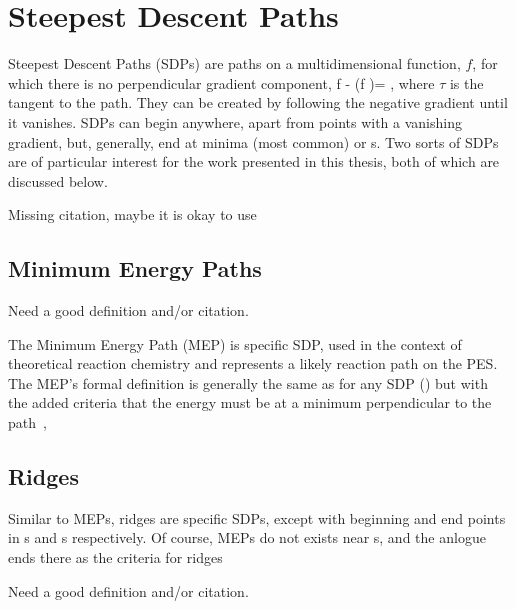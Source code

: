 \section{Steepest Descent Paths}
\label{sec:sdps}


Steepest Descent Paths (SDPs) are paths on a multidimensional function, $f$, for which there is no perpendicular gradient component,
\nabla f - (\nabla f \cdot \tau)\tau = ,
\eeq
where $\tau$ is the tangent to the path.
They can be created by following the negative gradient until it vanishes.
SDPs can begin anywhere, apart from points with a vanishing gradient, but, generally, end at minima (most common) or \sap{}s.
Two sorts of SDPs are of particular interest for the work presented in this thesis, both of which are discussed below.

\bit
\item Missing citation, maybe it is okay to use \cite{gradient-extramals-ruedenberg-1993}
\eit

\subsection{Minimum Energy Paths}
\label{sec:meps}

\bit
\item Need a good definition and/or citation.
\eit

The Minimum Energy Path (MEP) is specific SDP, used in the context of theoretical reaction chemistry and represents a likely reaction path on the PES.
The MEP's formal definition is generally the same as for any SDP () but with the added criteria that the energy must be at a minimum perpendicular to the path~\cite{neb-polemic-henkelman1},
\text{\expand}
\eeq

\subsection{Ridges}
\label{sec:ridges}

Similar to MEPs, ridges are specific SDPs, except with beginning and end points in s and s respectively.
Of course, MEPs do not exists near s, and the anlogue ends there as the criteria for ridges \expand

\bit
\item Need a good definition and/or citation.
\eit

